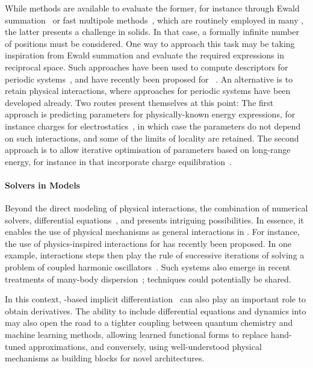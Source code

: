 While methods are available to evaluate the former, for instance through Ewald summation~\cite{e1921p,dyp1993p} or fast multipole methods~\cite{gr1987p,wh1994p}, which are routinely employed in many \ffs, the latter presents a challenge in solids.
In that case, a formally infinite number of positions must be considered.
One way to approach this task may be taking inspiration from Ewald summation and evaluate the required expressions in reciprocal space. Such approaches have been used to compute descriptors for periodic systems~\cite{zksg2018q,gc2019q,yhgx2022a}, and have recently been proposed for \mpnns~\cite{kggg2023a}.
An alternative is to retain physical interactions, where approaches for periodic systems have been developed already.
Two routes present themselves at this point: The first approach is predicting parameters for physically-known energy expressions, for instance charges for electrostatics~\cite{msb2012q}, in which case the parameters do not depend on such interactions, and some of the limits of locality are retained. The second approach is to allow iterative optimisation of parameters based on long-range energy, for instance in \nns that incorporate charge equilibration~\cite{b2021q}.

\paragraph{Solvers in Models}
Beyond the direct modeling of physical interactions, the combination of numerical solvers, differential equations~\cite{crbd2018m}, and \nns presents intriguing possibilities.
In essence, it enables the use of physical mechanisms as general interactions in \nns.
For instance, the use of physics-inspired interactions for \mpnns has recently been proposed.
In one example, interactions steps then play the rule of successive iterations of solving a problem of coupled harmonic oscillators~\cite{rcmb2022a}. Such systems also emerge in recent treatments of many-body dispersion~\cite{tdcs2012p,gkt2022a}; techniques could potentially be shared.

In this context, \ad-based implicit differentiation~\cite{bbpv2021m} can also play an important role to obtain derivatives. The ability to include differential equations and dynamics into \nns may also open the road to a tighter coupling between quantum chemistry and machine learning methods, allowing learned functional forms to replace hand-tuned approximations, and conversely, using well-understood physical mechanisms as building blocks for novel \nn architectures.
